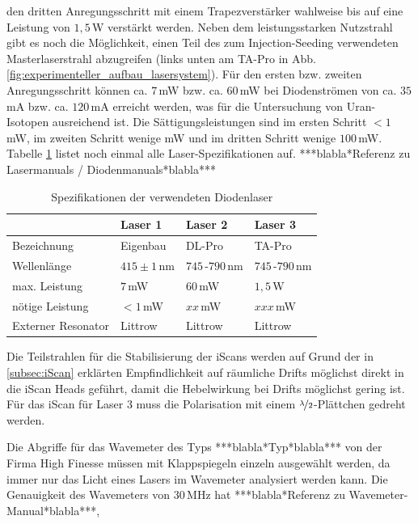den dritten Anregungsschritt mit einem Trapezverstärker wahlweise bis auf eine
Leistung von $1,5\,$W verstärkt werden. Neben dem leistungsstarken Nutzstrahl
gibt es noch die Möglichkeit, einen Teil des zum Injection-Seeding verwendeten
Masterlaserstrahl abzugreifen (links unten am TA-Pro in Abb.
\ref{fig:experimenteller_aufbau_lasersystem}). Für den ersten bzw.
zweiten Anregungsschritt können ca. $7\,$mW bzw. ca. $60\,$mW bei Diodenströmen von ca. $35\,$mA bzw. ca.
$120\,$mA erreicht werden, was für die Untersuchung von Uran-Isotopen
ausreichend ist. Die Sättigungsleistungen sind im ersten Schritt $<1\,$mW, im
zweiten Schritt wenige mW und im dritten Schritt wenige $100\,$mW. Tabelle \ref{tab:laser_spezifikationen} listet noch einmal alle
Laser-Spezifikationen auf.
***blabla*Referenz zu Lasermanuals / Diodenmanuals*blabla***\par
\begin{table}
	\begin{tabular}{p{}|p{}p{}p{}}
		\toprule
		& Laser 1 & Laser 2 & Laser 3\\
		\midrule[1px]
		\hline
		Bezeichnung & Eigenbau & DL-Pro & TA-Pro\\
		Wellenlänge & $415\pm1\,$nm & $745\,$-$790\,$nm & $745\,$-$790\,$nm\\
		max. Leistung & $7\,$mW & $60\,$mW & $1,5\,$W\\
		nötige Leistung & $<1\,$mW & $xx\,$mW & $xxx\,$mW\\
		Externer Resonator & Littrow & Littrow & Littrow\\
		\bottomrule[1px]
	\end{tabular}
	\caption[Spezifikationen der verwendeten Diodenlaser]{Spezifikationen der
	verwendeten Diodenlaser}
	\label{tab:laser_spezifikationen}
\end{table}
Die Teilstrahlen für die Stabilisierung der iScans werden auf Grund der in
\ref{subsec:iScan} erklärten Empfindlichkeit auf räumliche Drifts möglichst
direkt in die iScan Heads geführt, damit die Hebelwirkung bei Drifts möglichst
gering ist. Für das iScan für Laser 3 muss die Polarisation mit einem
$\nicefrac{\lambda}{2}$-Plättchen gedreht werden.\par Die Abgriffe für das Wavemeter des Typs ***blabla*Typ*blabla*** von der Firma
High Finesse müssen mit Klappspiegeln einzeln ausgewählt werden, da immer nur das
Licht eines Lasers im Wavemeter analysiert werden kann. Die Genauigkeit des
Wavemeters von $30\,$MHz hat ***blabla*Referenz zu Wavemeter-Manual*blabla***,
